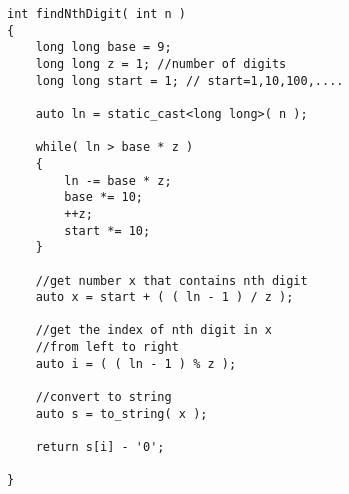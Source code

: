 \setcounter{lstlisting}{0}
\begin{lstlisting}[style=customc, caption={Mathematical Induction}]
int findNthDigit( int n )
{
    long long base = 9;
    long long z = 1; //number of digits
    long long start = 1; // start=1,10,100,....

    auto ln = static_cast<long long>( n );

    while( ln > base * z )
    {
        ln -= base * z;
        base *= 10;
        ++z;
        start *= 10;
    }

    //get number x that contains nth digit
    auto x = start + ( ( ln - 1 ) / z );

    //get the index of nth digit in x
    //from left to right
    auto i = ( ( ln - 1 ) % z );

    //convert to string
    auto s = to_string( x );

    return s[i] - '0';

}
\end{lstlisting}
